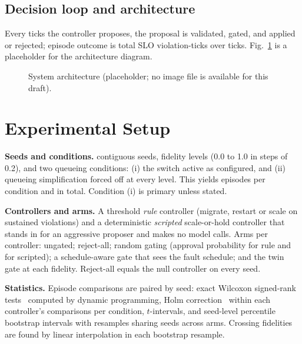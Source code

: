 \documentclass[conference]{IEEEtran}
\begin{document}
\subsection{Decision loop and architecture}
Every \DecisionInterval{} ticks the controller proposes, the proposal is validated, gated, and applied or rejected; episode outcome is total SLO violation-ticks over \EpisodeTicks{} ticks. Fig.~\ref{fig:arch} is a placeholder for the architecture diagram.

\begin{figure}[t]
\centering
{}
\caption{System architecture (placeholder; no image file is available for this draft).}
\label{fig:arch}
\end{figure}

\section{Experimental Setup}
\textbf{Seeds and conditions.} \NSeeds{} contiguous seeds, \NFidelity{} fidelity levels (0.0 to 1.0 in steps of 0.2), and two queueing conditions: (i) the switch active as configured, and (ii) queueing simplification forced off at every level. This yields \EpisodesPerCondition{} episodes per condition and \EpisodesTotal{} in total. Condition (i) is primary unless stated.

\textbf{Controllers and arms.} A threshold \emph{rule} controller (migrate, restart or scale on sustained violations) and a deterministic \emph{scripted} scale-or-hold controller that stands in for an aggressive proposer and makes no model calls. Arms per controller: ungated; reject-all; random gating (approval probability \RandomGatePRule{} for rule and \RandomGatePScr{} for scripted); a schedule-aware gate that sees the fault schedule; and the twin gate at each fidelity. Reject-all equals the null controller on every seed.

\textbf{Statistics.} Episode comparisons are paired by seed: exact Wilcoxon signed-rank tests~\cite{wilcoxon} computed by dynamic programming, Holm correction~\cite{holm} within each controller's \HolmFamilySize{} comparisons per condition, $t$-intervals, and seed-level percentile bootstrap intervals with \BootResamples{} resamples sharing seeds across arms. Crossing fidelities are found by linear interpolation in each bootstrap resample.
\end{document}
